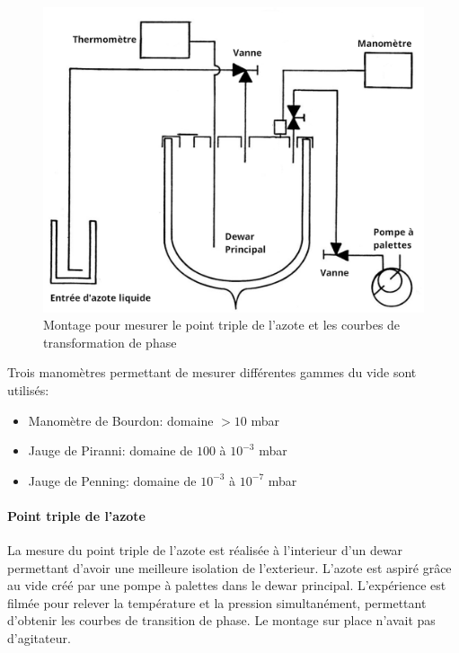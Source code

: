 \begin{minipage}{\textwidth}
\begin{figure}
    \includegraphics[width=\linewidth]{figures/montage_point_triple.png}
    \caption{Montage pour mesurer le point triple de l'azote et les courbes de transformation de phase}
    \label{fig:montagepointtriple}
\end{figure}

Trois manomètres permettant de mesurer différentes gammes du vide sont utilisés:

\begin{itemize}
    \item Manomètre de Bourdon: domaine \(> 10\) \unit{\milli\bar}
    \item Jauge de Piranni: domaine de \(100\) à \(10^{-3}\) \unit{\milli\bar}
    \item Jauge de Penning: domaine de \(10^{-3}\) à \(10^{-7}\) \unit{\milli\bar}
\end{itemize}

\paragraph*{Point triple de l'azote}
La mesure du point triple de l'azote est réalisée à l'interieur d'un dewar permettant d'avoir une meilleure isolation de l'exterieur. L'azote est aspiré grâce au vide créé par une pompe à palettes dans le dewar principal. L'expérience est filmée pour relever la température et la pression simultanément, permettant d'obtenir les courbes de transition de phase. Le montage sur place n'avait pas d'agitateur.
\end{minipage}

